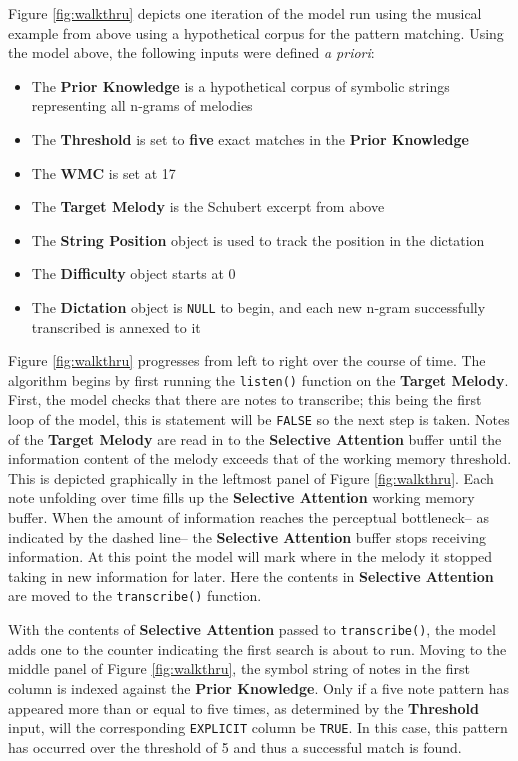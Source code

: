 \documentclass[12pt,]{book}
\providecommand{\tightlist}{%
  \setlength{\itemsep}{0pt}\setlength{\parskip}{0pt}}
\begin{document}
Figure \ref{fig:walkthru} depicts one iteration of the model run using the musical example from above using a hypothetical corpus for the pattern matching.
Using the model above, the following inputs were defined \emph{a priori}:

\begin{itemize}
\tightlist
\item
  The \textbf{Prior Knowledge} is a hypothetical corpus of symbolic strings representing all n-grams of melodies
\item
  The \textbf{Threshold} is set to \textbf{five} exact matches in the \textbf{Prior Knowledge}
\item
  The \textbf{WMC} is set at 17
\item
  The \textbf{Target Melody} is the Schubert excerpt from above
\item
  The \textbf{String Position} object is used to track the position in the dictation
\item
  The \textbf{Difficulty} object starts at 0
\item
  The \textbf{Dictation} object is \texttt{NULL} to begin, and each new n-gram successfully transcribed is annexed to it
\end{itemize}

Figure \ref{fig:walkthru} progresses from left to right over the course of time.
The algorithm begins by first running the \texttt{listen()} function on the \textbf{Target Melody}.
First, the model checks that there are notes to transcribe; this being the first loop of the model, this is statement will be \texttt{FALSE} so the next step is taken.
Notes of the \textbf{Target Melody} are read in to the \textbf{Selective Attention} buffer until the information content of the melody exceeds that of the working memory threshold.
This is depicted graphically in the leftmost panel of Figure \ref{fig:walkthru}.
Each note unfolding over time fills up the \textbf{Selective Attention} working memory buffer.
When the amount of information reaches the perceptual bottleneck-- as indicated by the dashed line-- the \textbf{Selective Attention} buffer stops receiving information.
At this point the model will mark where in the melody it stopped taking in new information for later.
Here the contents in \textbf{Selective Attention} are moved to the \texttt{transcribe()} function.

With the contents of \textbf{Selective Attention} passed to \texttt{transcribe()}, the model adds one to the counter indicating the first search is about to run.
Moving to the middle panel of Figure \ref{fig:walkthru}, the symbol string of notes in the first column is indexed against the \textbf{Prior Knowledge}.
Only if a five note pattern has appeared more than or equal to five times, as determined by the \textbf{Threshold} input, will the corresponding \texttt{EXPLICIT} column be \texttt{TRUE}.
In this case, this pattern has occurred over the threshold of 5 and thus a successful match is found.
\end{document}
